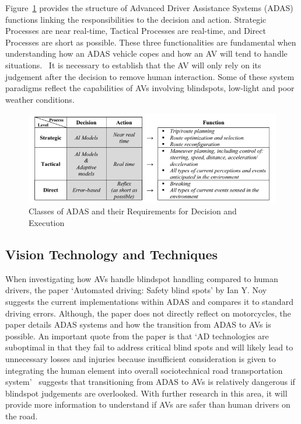 \documentclass[12pt]{report} %
\begin{document}
		Figure~\ref{fig:adasFunctionsIonita} provides the structure of Advanced Driver Assistance Systems (ADAS) functions linking the responsibilities to the decision and action. Strategic Processes are near real-time, Tactical Processes are real-time, and Direct Processes are short as possible. These three functionalities are fundamental when understanding how an ADAS vehicle copes and how an AV will tend to handle situations.~\cite{ionita_autonomous_2017} It is necessary to establish that the AV will only rely on its judgement after the decision to remove human interaction. Some of these system paradigms reflect the capabilities of AVs involving blindspots, low-light and poor weather conditions.
		\begin{figure}[h]
			\centering
			\includegraphics[width=\columnwidth]{Figures/literature_review/proposal/SystemFunctionality-3.png}
			\caption{Classes of ADAS and their Requirements for Decision and Execution~\cite{ionita_autonomous_2017}}
			\label{fig:adasFunctionsIonita}
		\end{figure}

	\subsection{Vision Technology and Techniques}
		When investigating how AVs handle blindspot handling compared to human drivers, the paper `Automated driving: Safety blind spots' by Ian Y. Noy~\cite{noy_automated_2018} suggests the current implementations within ADAS and compares it to standard driving errors. Although, the paper does not directly reflect on motorcycles, the paper details ADAS systems and how the transition from ADAS to AVs is possible. An important quote from the paper is that `AD technologies are suboptimal in that they fail to address critical blind spots and will likely lead to unnecessary losses and injuries because insufficient consideration is given to integrating the human element into overall sociotechnical road transportation system'~\cite{noy_automated_2018} suggests that transitioning from ADAS to AVs is relatively dangerous if blindspot judgements are overlooked. With further research in this area, it will provide more information to understand if AVs are safer than human drivers on the road.
\end{document}
